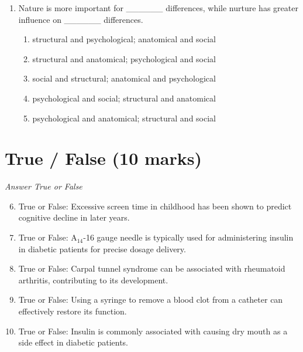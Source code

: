 \documentclass[12pt]{article}
\begin{document}
\begin{enumerate}[label=\arabic*.]
\begin{enumerate}[label=(\alph*)]
    \item If the incidence rate of the disease falls.
    \item If effective treatment for the disease becomes widely available.
    \item If vaccination against the disease becomes more common.
    \item If the disease mutates to a less harmful form.
    \item If the population's overall health improves.
\end{enumerate}
\item Nature is more important for \_\_\_\_\_\_ differences, while nurture has greater influence on \_\_\_\_\_\_ differences.
\begin{enumerate}[label=(\alph*)]
    \item structural and psychological; anatomical and social
    \item structural and anatomical; psychological and social
    \item social and structural; anatomical and psychological
    \item psychological and social; structural and anatomical
    \item psychological and anatomical; structural and social
\end{enumerate}
\end{enumerate}

\section*{True / False (10 marks)}
\textit{Answer True or False}
\begin{enumerate}[label=\arabic*.]
\setcounter{enumi}{5}
\item True or False: Excessive screen time in childhood has been shown to predict cognitive decline in later years.
\item True or False: A$_{14}$-16 gauge needle is typically used for administering insulin in diabetic patients for precise dosage delivery.
\item True or False: Carpal tunnel syndrome can be associated with rheumatoid arthritis, contributing to its development.
\item True or False: Using a syringe to remove a blood clot from a catheter can effectively restore its function.
\item True or False: Insulin is commonly associated with causing dry mouth as a side effect in diabetic patients.
\end{enumerate}
\end{document}
